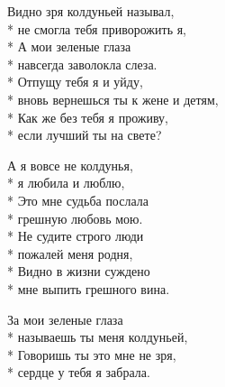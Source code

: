\medskip

\begin{minipage}{\linewidth}
Видно зря колдуньей называл,\\*
не смогла тебя приворожить я,\\*
А мои зеленые глаза\\*
навсегда заволокла слеза.\\*
Отпущу тебя я и уйду,\\*
вновь вернешься ты к жене и детям,\\*
Как же без тебя я проживу,\\*
если лучший ты на свете?\\
\end{minipage}\par\medskip\nobreak

\medskip

\begin{minipage}{\linewidth}
\hspace*{1.5em}А я вовсе не колдунья,\\*
\hspace*{1.5em}я любила и люблю,\\*
\hspace*{1.5em}Это мне судьба послала\\*
\hspace*{1.5em}грешную любовь мою.\\*
\hspace*{1.5em}Не судите строго люди\\*
\hspace*{1.5em}пожалей меня родня,\\*
\hspace*{1.5em}Видно в жизни суждено\\*
\hspace*{1.5em}мне выпить грешного вина.\\
\end{minipage}\par\medskip\nobreak

\medskip

\begin{minipage}{\linewidth}
За мои зеленые глаза\\*
называешь ты меня колдуньей,\\*
Говоришь ты это мне не зря,\\*
сердце у тебя я забрала.\\
\end{minipage}\par\medskip\nobreak

